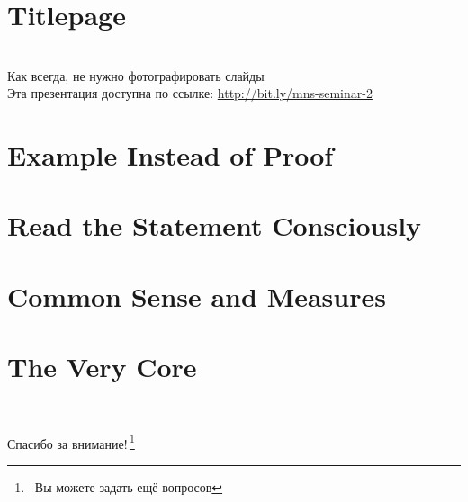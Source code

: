 \documentclass[aspectratio=1610,12pt]{beamer}
\begin{document}
\renewcommand{\thefootnote}{/*\!/}
\section[•]{Titlepage}
\begin{frame}\titlepage\end{frame}



\begin{frame} \begin{center}
	{\small\ } \\ [0.7cm]
	{\Large Как всегда, не нужно фотографировать слайды} \\ [0.9cm]
	{\small Эта презентация доступна по ссылке: \url{http://bit.ly/mns-seminar-2}}
\end{center} \end{frame}

\section[Доказательство?]{Example Instead of Proof}


\section[Условие?]{Read the Statement Consciously}


\section[Размерности]{Common Sense and Measures}


\section[Суть?]{The Very Core}




\renewcommand{\thefootnote}{/*\!/}
\begin{frame}
	\ \\
	\centerline{\huge Спасибо за внимание!\,\footnote{\ Вы можете задать ещё вопросов}}
\end{frame}
\end{document}
